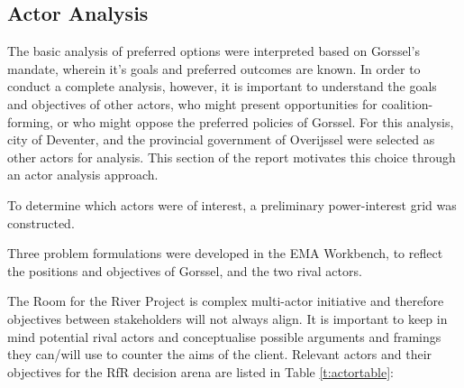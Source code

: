 \subsection{Actor Analysis}
The basic analysis of preferred options were interpreted based on Gorssel's mandate, wherein it's goals and preferred outcomes are known. In order to conduct a complete analysis, however, it is important to understand the goals and objectives of other actors, who might present opportunities for coalition-forming, or who might oppose the preferred policies of Gorssel. For this analysis, city of Deventer, and the provincial government of Overijssel were selected as other actors for analysis. This section of the report motivates this choice through an actor analysis approach. 

To determine which actors were of interest, a preliminary power-interest grid was constructed.



Three problem formulations were developed in the EMA Workbench, to reflect the positions and objectives of Gorssel, and the two rival actors.

The Room for the River Project is complex multi-actor initiative and therefore objectives between stakeholders will not always align. It is important to keep in mind potential rival actors and conceptualise possible arguments and framings they can/will use to counter the aims of the client. Relevant actors and their objectives for the RfR decision arena are listed in Table \ref{t:actortable}:

